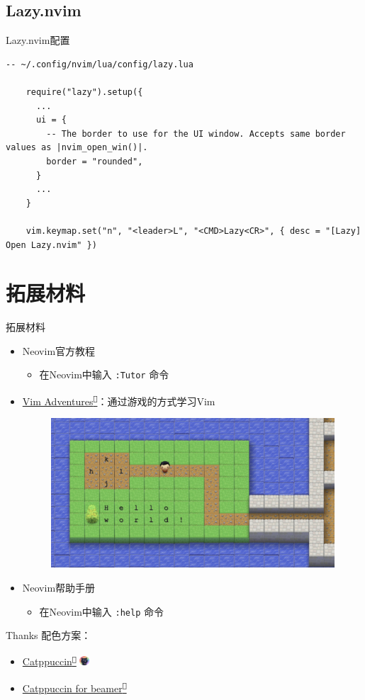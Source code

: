 \documentclass[aspectratio=169]{ctexbeamer}
\newcommand{\nerd}[1]{\texttt{#1}}
\newcommand{\link}[3][]{\href{#3}{#2\textsuperscript{\nerd{}}}}
\begin{document}
  \subsection{Lazy.nvim}
    \begin{frame}[fragile]{Lazy.nvim配置}
      \begin{lstlisting}[language={[5.1]lua}]
    -- ~/.config/nvim/lua/config/lazy.lua

    require("lazy").setup({
      ...
      ui = {
        -- The border to use for the UI window. Accepts same border values as |nvim_open_win()|.
        border = "rounded",
      }
      ...
    }

    vim.keymap.set("n", "<leader>L", "<CMD>Lazy<CR>", { desc = "[Lazy] Open Lazy.nvim" })
      \end{lstlisting}
    \end{frame}

\section{拓展材料}
  \begin{frame}[fragile]{拓展材料}
    \begin{itemize}
      \item Neovim官方教程
        \begin{itemize}
          \item 在Neovim中输入 \lstinline[style=nvim]{:Tutor} 命令
        \end{itemize}
      \item \link{Vim Adventures}{https://vim-adventures.com/}：通过游戏的方式学习Vim
        \begin{figure}[H]
          \centering
          \includegraphics[width=0.4\linewidth]{./Figures/Vim_Adventure.jpg}
        \end{figure}
      \item Neovim帮助手册
        \begin{itemize}
          \item 在Neovim中输入 \lstinline[style=nvim]{:help} 命令
        \end{itemize}
    \end{itemize}
  \end{frame}

  \begin{frame}{Thanks}
    配色方案：
    \begin{itemize}
      \item \link{Catppuccin}{https://catppuccin.com/} \includegraphics[height=10pt]{./Figures/Catppuccin_logo.png}
      \item \link{Catppuccin for beamer}{https://github.com/atticus-sullivan/beamercolortheme}
    \end{itemize}
  \end{frame}
\end{document}
